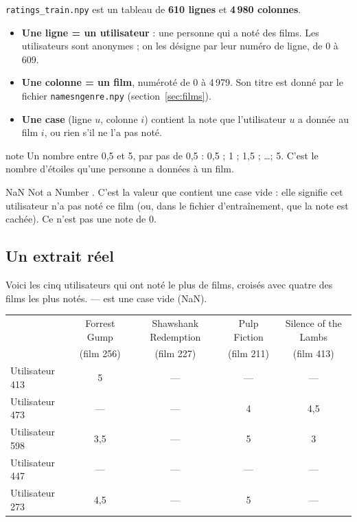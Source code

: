 \documentclass[11pt,a4paper]{article}
\begin{document}
\texttt{ratings\_train.npy} est un tableau de \textbf{610 lignes} et \textbf{4\,980 colonnes}.

\begin{itemize}
  \item \textbf{Une ligne = un utilisateur} : une personne qui a noté des films. Les
        utilisateurs sont anonymes ; on les désigne par leur numéro de ligne, de 0 à 609.
  \item \textbf{Une colonne = un film}, numéroté de 0 à 4\,979. Son titre est donné par
        le fichier \texttt{namesngenre.npy} (section~\ref{sec:films}).
  \item \textbf{Une case} (ligne $u$, colonne $i$) contient la note que l'utilisateur $u$
        a donnée au film $i$, ou rien s'il ne l'a pas noté.
\end{itemize}

\begin{definition}{note}
Un nombre entre 0,5 et 5, par pas de 0,5 : 0,5 ; 1 ; 1,5 ; \dots ; 5. C'est le nombre
d'étoiles qu'une personne a données à un film.
\end{definition}

\begin{definition}{NaN}
\og Not a Number \fg. C'est la valeur que contient une case vide : elle signifie
\og cet utilisateur n'a pas noté ce film \fg (ou, dans le fichier d'entraînement, que la
note est cachée). Ce n'est pas une note de 0.
\end{definition}

\subsection{Un extrait réel}

Voici les cinq utilisateurs qui ont noté le plus de films, croisés avec quatre des films
les plus notés. \og --- \fg{} est une case vide (NaN).

\begin{center}
\small\setlength{\tabcolsep}{4pt}
\begin{tabular}{lcccc}
\toprule
 & Forrest Gump & Shawshank Redemption & Pulp Fiction & Silence of the Lambs \\
 & (film 256) & (film 227) & (film 211) & (film 413) \\
\midrule
Utilisateur 413 & 5 & --- & --- & --- \\
Utilisateur 473 & --- & --- & 4 & 4,5 \\
Utilisateur 598 & 3,5 & --- & 5 & 3 \\
Utilisateur 447 & --- & --- & --- & --- \\
Utilisateur 273 & 4,5 & --- & 5 & --- \\
\bottomrule
\end{tabular}
\end{center}
\end{document}
